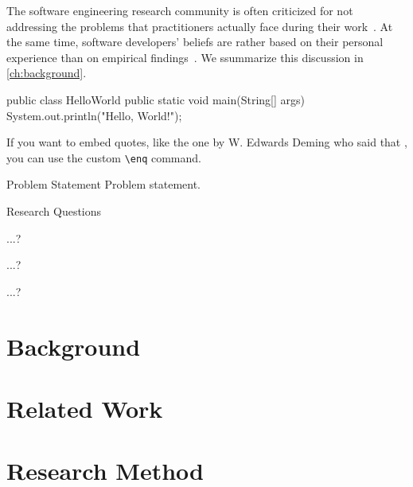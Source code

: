 \documentclass[
    pdftex,
    final,
    11pt,
    a4paper,
    parskip=false, %
    twoside, %
    footheight=0mm, %
    footinclude=false,
    toc=bibliography, %
    toc=listof %
]{scrbook} %
\begin{document}
The software engineering research community is often criticized for not addressing the problems that practitioners actually face during their work~\cite{Briand2012}.
At the same time, software developers' beliefs are rather based on their personal experience than on empirical findings~\cite{DevanbuZimmermannOthers2016}.
We s\textsf{s}ummarize this discussion in \autoref{ch:background}.

\begin{java}
public class HelloWorld {
  public static void main(String[] args) {
    System.out.println("Hello, World!");
  }
}
\end{java}

If you want to embed quotes, like the one by W. Edwards Deming who said that , you can use the custom \texttt{\textbackslash enq} command.


\begin{graybox}{Problem Statement}
Problem statement.
\end{graybox}


\begin{graybox}{Research Questions}
\begin{description}[style=multiline, labelindent=\parindent, leftmargin=\rqindent, itemsep=-1ex]
\item[RQ1] ...?
\item[RQ2] ...?
\item[RQ3] ...?
\end{description}
\end{graybox}

\chapter{Background}
\label{ch:background}

\lipsum[1-12]

\chapter{Related Work}
\label{ch:related-work}

\lipsum[1-4]

\chapter{Research Method}
\label{ch:research-method}
\end{document}
